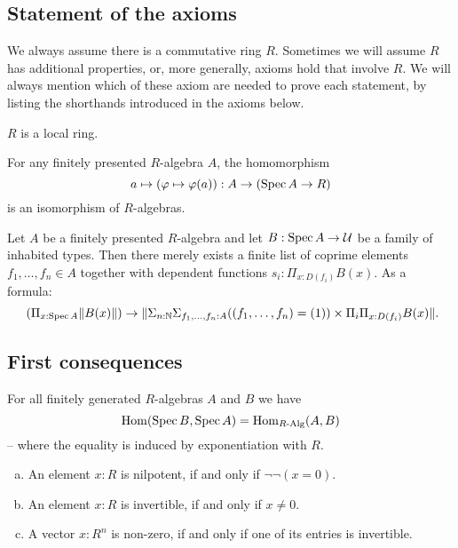 \subsection{Statement of the axioms}
We always assume there is a commutative ring $R$.
Sometimes we will assume $R$ has additional properties, or, more generally,
axioms hold that involve $R$.
We will always mention which of these axiom are needed to prove each statement,
by listing the shorthands introduced in the axioms below.

\begin{axiom}[Loc]%
  \label{loc}
  $R$ is a local ring.
\end{axiom}

\begin{axiom}[SQC]%
  \label{sqc}
  For any finitely presented $R$-algebra $A$, the homomorphism
  \[ a \mapsto (\varphi\mapsto \varphi(a)) : A \to (\operatorname{Spec} A \to R)\]
  is an isomorphism of $R$-algebras.
\end{axiom}

\begin{axiom}[Z-choice]%
  \label{Z-choice}
  Let $A$ be a finitely presented $R$-algebra
  and let $B : \operatorname{Spec} A \to \mathcal{U}$ be a family of inhabited types.
  Then there merely exists
  a finite list of coprime elements $f_1, \dots, f_n \in A$
  together with dependent functions $s_i : \Pi_{x : D(f_i)} B(x)$.
  As a formula:
  \[ (\Pi_{x : \Spec A} \propTrunc{B(x)}) \to
     \propTrunc{ \Sigma_{n : \N} \Sigma_{f_1, \dots, f_n : A}
      ((f_1, \dots, f_n) = (1)) \times
      \Pi_i \Pi_{x : D(f_i)} B(x) }
     \rlap{.}
  \]
\end{axiom}

\subsection{First consequences}

\begin{proposition}%
  For all finitely generated $R$-algebras $A$ and $B$ we have
  \[ \mathrm{Hom}(\operatorname{Spec} B, \operatorname{Spec} A)=\mathrm{Hom}_{R\text{-}\mathrm{Alg}}(A,B)\]
  -- where the equality is induced by exponentiation with $R$.
\end{proposition}

\begin{proposition}%
  \label{nilpotence-double-negation}\label{non-zero-invertible}\label{generalized-field-property}
  
  \begin{enumerate}[(a)]
  \item An element $x:R$ is nilpotent,
    if and only if $\neg \neg (x=0)$.
  \item An element $x:R$ is invertible,
    if and only if $x\neq 0$.
  \item A vector $x:R^n$ is non-zero,
    if and only if one of its entries is invertible.
  \end{enumerate}
\end{proposition}
